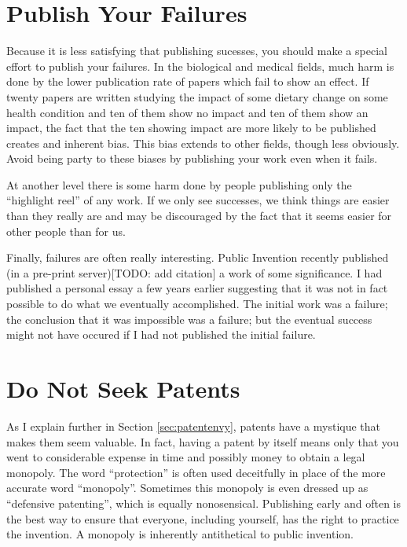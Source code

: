 \documentclass[
	fontsize=10pt, %
	twoside=false, %
	secnumdepth=1, %
]{kaobook}
\begin{document}
\section{Publish Your Failures}

Because it is less satisfying that publishing sucesses, you should
make a special effort to publish your failures.
In the biological and medical fields, much harm is done by
the lower publication rate of papers which fail to show an effect.
If twenty papers are written studying the impact of some dietary change
on some health condition and ten of them show no impact and ten of them
show an impact, the fact that the ten showing impact are more likely
to be published creates and inherent bias.
This bias extends to other fields, though less obviously.
Avoid being party to these biases by publishing your work even when it fails.

At another level there is some harm done by people publishing only
the ``highlight reel'' of any work. If we only see successes, we think
things are easier than they really are and may be discouraged by the
fact that it seems easier for other people than for us.

Finally, failures are often really interesting.
Public Invention recently published (in a pre-print server)[TODO: add citation]
a work of some significance. I had published a personal essay a few years earlier
suggesting that it was not in fact possible to do what we eventually accomplished.
The initial work was a failure; the conclusion that it was impossible was a failure;
but the eventual success might not have occured if I had not published the initial failure.

\section{Do Not Seek Patents}

As I explain further in Section \ref{sec:patentenvy}, patents have a mystique
that makes them seem valuable. In fact, having a patent by itself means only
that you went to considerable expense in time and possibly money to obtain a legal monopoly.
The word ``protection'' is often used deceitfully in place of the more accurate word ``monopoly''.
Sometimes this monopoly is even dressed up as ``defensive patenting'', which is
equally nonosensical.
Publishing early and often is the best way to ensure that everyone, including yourself,
has the right to practice the invention.
A monopoly is inherently antithetical to public invention.
\end{document}
